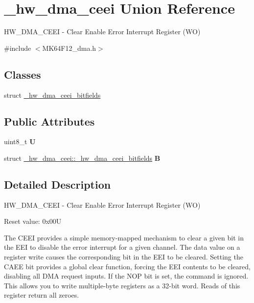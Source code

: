\hypertarget{union__hw__dma__ceei}{}\section{\+\_\+hw\+\_\+dma\+\_\+ceei Union Reference}
\label{union__hw__dma__ceei}


H\+W\+\_\+\+D\+M\+A\+\_\+\+C\+E\+EI -\/ Clear Enable Error Interrupt Register (WO)  




{\ttfamily \#include $<$M\+K64\+F12\+\_\+dma.\+h$>$}

\subsection*{Classes}
\begin{DoxyCompactItemize}
\item 
struct \hyperlink{struct__hw__dma__ceei_1_1__hw__dma__ceei__bitfields}{\+\_\+hw\+\_\+dma\+\_\+ceei\+\_\+bitfields}
\end{DoxyCompactItemize}
\subsection*{Public Attributes}
\begin{DoxyCompactItemize}
\item 
uint8\+\_\+t {\bfseries U}\hypertarget{union__hw__dma__ceei_a9424079bc8c92f8cde2e9e7ef27c131d}{}\label{union__hw__dma__ceei_a9424079bc8c92f8cde2e9e7ef27c131d}

\item 
struct \hyperlink{struct__hw__dma__ceei_1_1__hw__dma__ceei__bitfields}{\+\_\+hw\+\_\+dma\+\_\+ceei\+::\+\_\+hw\+\_\+dma\+\_\+ceei\+\_\+bitfields} {\bfseries B}\hypertarget{union__hw__dma__ceei_a9706ef5e288da34ad8a6fd218367bb72}{}\label{union__hw__dma__ceei_a9706ef5e288da34ad8a6fd218367bb72}

\end{DoxyCompactItemize}


\subsection{Detailed Description}
H\+W\+\_\+\+D\+M\+A\+\_\+\+C\+E\+EI -\/ Clear Enable Error Interrupt Register (WO) 

Reset value\+: 0x00U

The C\+E\+EI provides a simple memory-\/mapped mechanism to clear a given bit in the E\+EI to disable the error interrupt for a given channel. The data value on a register write causes the corresponding bit in the E\+EI to be cleared. Setting the C\+A\+EE bit provides a global clear function, forcing the E\+EI contents to be cleared, disabling all D\+MA request inputs. If the N\+OP bit is set, the command is ignored. This allows you to write multiple-\/byte registers as a 32-\/bit word. Reads of this register return all zeroes. 

